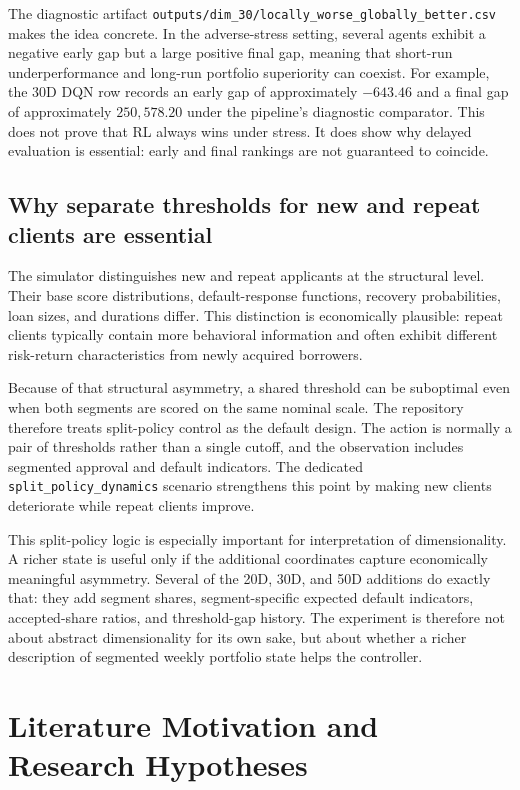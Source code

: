 \documentclass[12pt,a4paper]{article}
\begin{document}
The diagnostic artifact \texttt{outputs/dim\_30/locally\_worse\_globally\_better.csv} makes the idea concrete. In the adverse-stress setting, several agents exhibit a negative early gap but a large positive final gap, meaning that short-run underperformance and long-run portfolio superiority can coexist. For example, the 30D DQN row records an early gap of approximately $-643.46$ and a final gap of approximately $250{,}578.20$ under the pipeline's diagnostic comparator. This does not prove that RL always wins under stress. It does show why delayed evaluation is essential: early and final rankings are not guaranteed to coincide.

\subsection{Why separate thresholds for new and repeat clients are essential}

The simulator distinguishes new and repeat applicants at the structural level. Their base score distributions, default-response functions, recovery probabilities, loan sizes, and durations differ. This distinction is economically plausible: repeat clients typically contain more behavioral information and often exhibit different risk-return characteristics from newly acquired borrowers.

Because of that structural asymmetry, a shared threshold can be suboptimal even when both segments are scored on the same nominal scale. The repository therefore treats split-policy control as the default design. The action is normally a pair of thresholds rather than a single cutoff, and the observation includes segmented approval and default indicators. The dedicated \texttt{split\_policy\_dynamics} scenario strengthens this point by making new clients deteriorate while repeat clients improve.

This split-policy logic is especially important for interpretation of dimensionality. A richer state is useful only if the additional coordinates capture economically meaningful asymmetry. Several of the 20D, 30D, and 50D additions do exactly that: they add segment shares, segment-specific expected default indicators, accepted-share ratios, and threshold-gap history. The experiment is therefore not about abstract dimensionality for its own sake, but about whether a richer description of segmented weekly portfolio state helps the controller.

\section{Literature Motivation and Research Hypotheses}
\end{document}
